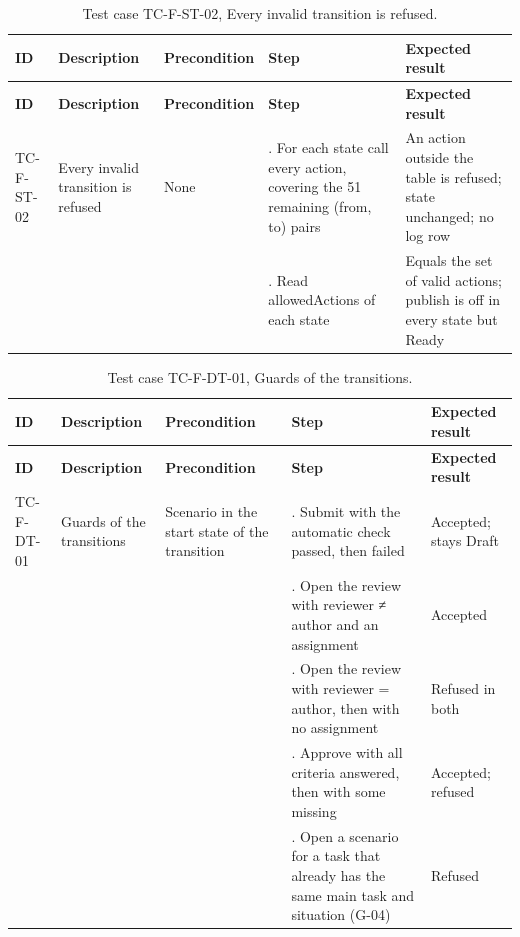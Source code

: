 {\small
\begin{longtable}{|>{\raggedright\arraybackslash}p{}|>{\raggedright\arraybackslash}p{}|>{\raggedright\arraybackslash}p{}|>{\raggedright\arraybackslash}p{}|>{\raggedright\arraybackslash}p{}|}
\caption{Test case TC-F-ST-02, Every invalid transition is refused.} \\
\hline
\textbf{ID} & \textbf{Description} & \textbf{Precondition} & \textbf{Step} & \textbf{Expected result} \\ \hline
\endfirsthead
\hline
\textbf{ID} & \textbf{Description} & \textbf{Precondition} & \textbf{Step} & \textbf{Expected result} \\ \hline
\endhead
TC-F-ST-02 & Every invalid transition is refused & None & 1. For each state call every action, covering the 51 remaining (from, to) pairs & An action outside the table is refused; state unchanged; no log row \\ \hline
 &  &  & 2. Read allowedActions of each state & Equals the set of valid actions; publish is off in every state but Ready \\ \hline
\end{longtable}
}

{\small
\begin{longtable}{|>{\raggedright\arraybackslash}p{}|>{\raggedright\arraybackslash}p{}|>{\raggedright\arraybackslash}p{}|>{\raggedright\arraybackslash}p{}|>{\raggedright\arraybackslash}p{}|}
\caption{Test case TC-F-DT-01, Guards of the transitions.} \\
\hline
\textbf{ID} & \textbf{Description} & \textbf{Precondition} & \textbf{Step} & \textbf{Expected result} \\ \hline
\endfirsthead
\hline
\textbf{ID} & \textbf{Description} & \textbf{Precondition} & \textbf{Step} & \textbf{Expected result} \\ \hline
\endhead
TC-F-DT-01 & Guards of the transitions & Scenario in the start state of the transition & 1. Submit with the automatic check passed, then failed & Accepted; stays Draft \\ \hline
 &  &  & 2. Open the review with reviewer ≠ author and an assignment & Accepted \\ \hline
 &  &  & 3. Open the review with reviewer = author, then with no assignment & Refused in both \\ \hline
 &  &  & 4. Approve with all criteria answered, then with some missing & Accepted; refused \\ \hline
 &  &  & 5. Open a scenario for a task that already has the same main task and situation (G-04) & Refused \\ \hline
\end{longtable}
}

